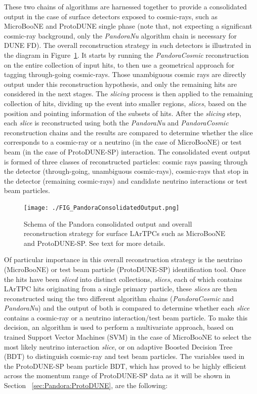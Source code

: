 These two chains of algorithms are harnessed together to provide a consolidated output in the case of surface detectors exposed to cosmic-rays, such as MicroBooNE and ProtoDUNE single phase (note that, not expecting a significant cosmic-ray background, only the {\it PandoraNu} algorithm chain is necessary for DUNE FD). The overall reconstruction strategy in such detectors is illustrated in the diagram in Figure~\ref{consolidated_reco}. It starts by running the {\it PandoraCosmic} reconstruction on the entire collection of input hits, to then use a geometrical approach for tagging through-going cosmic-rays. Those unambiguous cosmic rays are directly output under this reconstruction hypothesis, and only the remaining hits are considered in the next stages. The {\it slicing} process is then applied to the remaining collection of hits, dividing up the event into smaller regions, {\it slices}, based on the position and pointing information of the subsets of hits. After the {\it slicing}  step, each {\it slice} is reconstructed using both the {\it PandoraNu} and {\it PandoraCosmic} reconstruction chains and the results are compared to determine whether the slice corresponds to a cosmic-ray or a neutrino (in the case of MicroBooNE) or test beam (in the case of ProtoDUNE-SP) interaction. The consolidated event output is formed of three classes of reconstructed particles: cosmic rays passing through the detector (through-going, unambiguous cosmic-rays), cosmic-rays that stop in the detector (remaining cosmic-rays) and candidate neutrino interactions or test beam particles.

\begin{figure}[!h!tbp]
\centering
\texttt{[image: ./FIG\_PandoraConsolidatedOutput.png]}
\caption{Schema of the Pandora consolidated output and overall reconstruction strategy for surface LArTPCs such as MicroBooNE and ProtoDUNE-SP. See text for more details.}
\label{consolidated_reco}
\end{figure}

Of particular importance in this overall reconstruction strategy is the neutrino (MicroBooNE) or test beam particle (ProtoDUNE-SP) identification tool. Once the hits have been {\it sliced} into distinct collections, {\it slices}, each of which contains LArTPC hits originating from a single primary particle, these {\it slices} are then reconstructed using the two different algorithm chains ({\it PandoraCosmic} and {\it PandoraNu}) and the output of both is compared to determine whether each {\it slice} contains a cosmic-ray or a neutrino interaction/test beam particle. To make this decision, an algorithm is used to perform a multivariate approach, based on trained Support Vector Machines (SVM) in the case of MicroBooNE to select the most likely neutrino interaction {\it slice}, or on adaptive Boosted Decision Tree (BDT) to distinguish cosmic-ray and test beam particles. The variables used in the ProtoDUNE-SP beam particle BDT, which has proved to be highly efficient across the momentum range of ProtoDUNE-SP data as it will be shown in Section ~\ref{sec:Pandora:ProtoDUNE}, are the following: 


